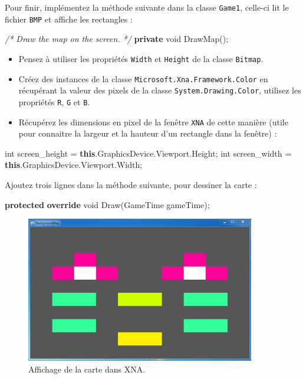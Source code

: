 \documentclass[11pt, a4paper]{article}
\newenvironment{Shaded}{}{}
\newcommand{\KeywordTok}[1]{\textcolor[rgb]{0.00,0.44,0.13}{\textbf{{#1}}}}
\newcommand{\DataTypeTok}[1]{\textcolor[rgb]{0.56,0.13,0.00}{{#1}}}
\newcommand{\CommentTok}[1]{\textcolor[rgb]{0.38,0.63,0.69}{\textit{{#1}}}}
\newcommand{\FunctionTok}[1]{\textcolor[rgb]{0.02,0.16,0.49}{{#1}}}
\newcommand{\NormalTok}[1]{{#1}}
\begin{document}
Pour finir, implémentez la méthode suivante dans la classe
\texttt{Game1}, celle-ci lit le fichier \texttt{BMP} et affiche les
rectangles :

\begin{Shaded}
\begin{Highlighting}[]
\CommentTok{/* Draw the map on the screen. */}
\KeywordTok{private} \DataTypeTok{void} \FunctionTok{DrawMap}\NormalTok{();}
\end{Highlighting}
\end{Shaded}

\begin{itemize}
\itemsep1pt\parskip0pt
\item
  Pensez à utiliser les propriétés \texttt{Width} et \texttt{Height} de
  la classe \texttt{Bitmap}.
\item
  Créez des instances de la classe
  \texttt{Microsoft.Xna.Framework.Color} en récupérant la valeur des
  pixels de la classe \texttt{System.Drawing.Color}, utilisez les
  propriétés \texttt{R}, \texttt{G} et \texttt{B}.
\item
  Récupérez les dimensions en pixel de la fenêtre \texttt{XNA} de cette
  manière (utile pour connaitre la largeur et la hauteur d'un rectangle
  dans la fenêtre) :
\end{itemize}

\begin{Shaded}
\begin{Highlighting}[]
\DataTypeTok{int} \NormalTok{screen_height = }\KeywordTok{this}\NormalTok{.}\FunctionTok{GraphicsDevice}\NormalTok{.}\FunctionTok{Viewport}\NormalTok{.}\FunctionTok{Height}\NormalTok{;}
\DataTypeTok{int} \NormalTok{screen_width = }\KeywordTok{this}\NormalTok{.}\FunctionTok{GraphicsDevice}\NormalTok{.}\FunctionTok{Viewport}\NormalTok{.}\FunctionTok{Width}\NormalTok{;}
\end{Highlighting}
\end{Shaded}

Ajoutez trois lignes dans la méthode suivante, pour dessiner la carte :

\begin{Shaded}
\begin{Highlighting}[]
\KeywordTok{protected} \KeywordTok{override} \DataTypeTok{void} \FunctionTok{Draw}\NormalTok{(GameTime gameTime);}
\end{Highlighting}
\end{Shaded}

\begin{figure}[h]
\begin{center}
\includegraphics[width=10cm]{../res/mapxna.png}
\end{center}
\caption{Affichage de la carte dans XNA.}
\end{figure}
\end{document}
